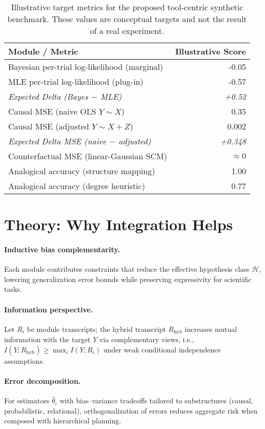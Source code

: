 \documentclass[11pt]{article}
\begin{document}
\begin{table}[t]
\centering
\begin{tabular}{l r}
\toprule
\textbf{Module / Metric} & \textbf{Illustrative Score} \\ \midrule
Bayesian per-trial log-likelihood (marginal) & -0.05 \\
MLE per-trial log-likelihood (plug-in) & -0.57 \\
\textit{Expected Delta (Bayes $-$ MLE)} & \textit{+0.52} \\
\addlinespace
Causal MSE (naive OLS $Y\!\sim\!X$) & 0.35 \\
Causal MSE (adjusted $Y\!\sim\!X{+}Z$) & 0.002 \\
\textit{Expected Delta MSE (naive $-$ adjusted)} & \textit{+0.348} \\
\addlinespace
Counterfactual MSE (linear-Gaussian SCM) & $\approx 0$ \\
\addlinespace
Analogical accuracy (structure mapping) & 1.00 \\
Analogical accuracy (degree heuristic) & 0.77 \\
\bottomrule
\end{tabular}
\caption{Illustrative target metrics for the proposed tool-centric synthetic benchmark. These values are conceptual targets and not the result of a real experiment.}
\label{tab:results}
\end{table}
\section{Theory: Why Integration Helps}
\paragraph{Inductive bias complementarity.}
Each module contributes constraints that reduce the effective hypothesis class $\mathcal{H}$, lowering generalization error bounds while preserving expressivity for scientific tasks.
\paragraph{Information perspective.}
Let $R_i$ be module transcripts; the hybrid transcript $R_\mathrm{hyb}$ increases mutual information with the target $Y$ via complementary views, i.e., $I(Y;R_\mathrm{hyb}) \ge \max_i I(Y;R_i)$ under weak conditional independence assumptions.
\paragraph{Error decomposition.}
For estimators $\hat{\theta}_i$ with bias--variance tradeoffs tailored to substructures (causal, probabilistic, relational), orthogonalization of errors reduces aggregate risk when composed with hierarchical planning.
\end{document}
